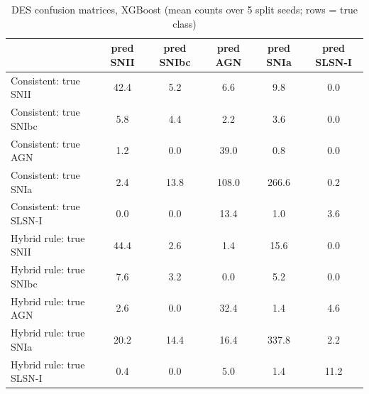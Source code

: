 \begin{table}
\centering
\caption{DES confusion matrices, XGBoost (mean counts over 5 split seeds; rows = true class)}
\begin{tabular}{lccccc}
\hline
 & pred SNII & pred SNIbc & pred AGN & pred SNIa & pred SLSN-I \\
\hline
Consistent: true SNII & 42.4 & 5.2 & 6.6 & 9.8 & 0.0 \\
Consistent: true SNIbc & 5.8 & 4.4 & 2.2 & 3.6 & 0.0 \\
Consistent: true AGN & 1.2 & 0.0 & 39.0 & 0.8 & 0.0 \\
Consistent: true SNIa & 2.4 & 13.8 & 108.0 & 266.6 & 0.2 \\
Consistent: true SLSN-I & 0.0 & 0.0 & 13.4 & 1.0 & 3.6 \\
Hybrid rule: true SNII & 44.4 & 2.6 & 1.4 & 15.6 & 0.0 \\
Hybrid rule: true SNIbc & 7.6 & 3.2 & 0.0 & 5.2 & 0.0 \\
Hybrid rule: true AGN & 2.6 & 0.0 & 32.4 & 1.4 & 4.6 \\
Hybrid rule: true SNIa & 20.2 & 14.4 & 16.4 & 337.8 & 2.2 \\
Hybrid rule: true SLSN-I & 0.4 & 0.0 & 5.0 & 1.4 & 11.2 \\
\hline
\end{tabular}
\end{table}
